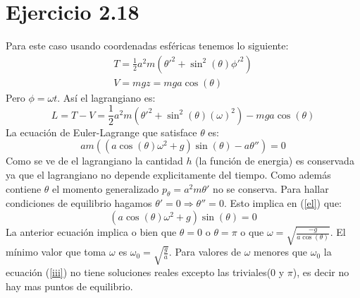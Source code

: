\documentclass[letterpaper,10pt]{article}
\begin{document}
\section*{Ejercicio 2.18}
Para este caso usando coordenadas esf\'ericas tenemos lo siguiente:
\begin{eqnarray}
T=\frac{1}{2} a^2 m \left(\theta '^2+\sin ^2(\theta
   ) \phi '^2\right)\\
V=mgz=m g a \cos (\theta )
\end{eqnarray}
Pero $\phi=\omega t$. As\'i el lagrangiano es:
\begin{equation}
L=T-V=\frac{1}{2} a^2 m \left(\theta '^2+\sin ^2(\theta
   ) (\omega)^2\right)-m g a \cos (\theta )
\end{equation}
La ecuaci\'on de Euler-Lagrange que satisface $\theta$ es:
\begin{equation}
a m \left(\left(a \cos (\theta ) \omega ^2+g\right)
   \sin (\theta )-a \theta ''\right)=0
\label{el}
\end{equation}
Como se ve de el lagrangiano la cantidad  $h$ (la funci\'on de energia) es conservada ya que el lagrangiano no depende explicitamente del tiempo. Como adem\'as contiene  $\theta$ el momento generalizado $p_\theta=a^2 m \theta '$ no se conserva.
Para hallar condiciones de equilibrio hagamos $\theta'=0\Longrightarrow \theta''=0$. Esto implica en (\ref{el}) que:
\begin{equation}
 \left(a \cos (\theta ) \omega ^2+g\right) \sin
   (\theta )=0
\label{iii}
\end{equation}
La anterior ecuaci\'on implica o bien que $\theta=0$ o $\theta=\pi$ o que $\omega=\sqrt{\frac{-g}{a \cos(\theta)}}$. El m\'inimo valor que toma $\omega$ es $\omega_0=\sqrt{\frac{g}{a}}$. Para valores de $\omega$ menores que $\omega_0$ la ecuaci\'on (\ref{iii}) no tiene soluciones reales excepto las triviales(0 y $\pi$), es decir no hay mas puntos de equilibrio.
\end{document}
